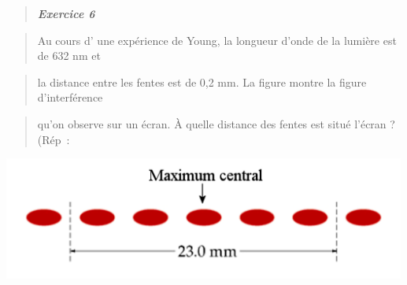 \begin{quote}
\end{quote}

\begin{quote}
\end{quote}

\begin{quote}
\end{quote}

\begin{quote}
\end{quote}

\begin{quote}
\end{quote}

\begin{quote}
\end{quote}

\begin{quote}
\end{quote}

\begin{quote}
\end{quote}

\begin{quote}
\end{quote}

\begin{quote}
\end{quote}

\begin{quote}
\emph{\textbf{Exercice 6}}
\end{quote}

\begin{quote}
Au cours d' une expérience de Young, la longueur d'onde de la lumière
est de 632 nm et
\end{quote}

\begin{quote}
la distance entre les fentes est de 0,2 mm. La figure montre la figure
d'interférence
\end{quote}

\begin{quote}
qu'on observe sur un écran. À quelle distance des fentes est situé
l'écran\textbf{ }? (Rép~:
\end{quote}

\includegraphics[width=13.259cm,height=4.045cm]{Pictures/100000010000059F000001B75001F99348A6D888.png}

